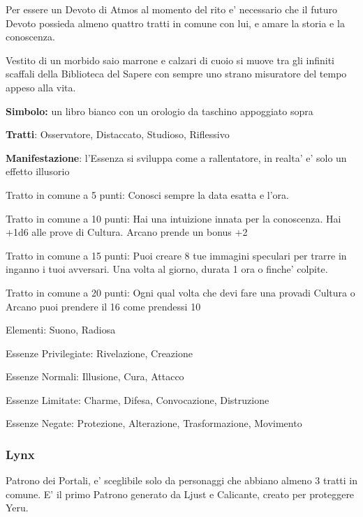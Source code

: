 \documentclass[a4paper,11pt,twoside,openany]{book}
\begin{document}
{		Per essere un Devoto di Atmos al momento del rito e' necessario che il futuro Devoto possieda almeno quattro tratti in comune con lui, e amare la storia e la conoscenza.
		
		Vestito di un morbido saio marrone e calzari di cuoio si muove tra gli infiniti scaffali della Biblioteca del Sapere con sempre uno strano misuratore del tempo appeso alla vita.
		
		\textbf{Simbolo:} un libro bianco con un orologio da taschino appoggiato
		sopra
		
		\textbf{Tratti}: Osservatore, Distaccato, Studioso, Riflessivo
		
		\textbf{Manifestazione}: l'Essenza si sviluppa come a rallentatore, in realta' e' solo un effetto illusorio
		
		\bigskip
		
		Tratto in comune a 5 punti: Conosci sempre la data esatta e l'ora.
		
		Tratto in comune a 10 punti: Hai una intuizione innata per la conoscenza. Hai +1d6 alle prove di Cultura. Arcano prende un bonus +2
		
		Tratto in comune a 15 punti: Puoi creare 8 tue immagini speculari per trarre in inganno i tuoi avversari. Una volta al giorno, durata 1 ora o finche' colpite.
		
		Tratto in comune a 20 punti: Ogni qual volta che devi fare una provadi Cultura o Arcano puoi prendere il 16 come prendessi 10
		
		\bigskip
		
		Elementi: Suono, Radiosa
		
		\bigskip
		
		Essenze Privilegiate: Rivelazione, Creazione
		
		Essenze Normali: Illusione, Cura, Attacco
		
		Essenze Limitate: Charme, Difesa, Convocazione, Distruzione
		
		Essenze Negate: Protezione, Alterazione, Trasformazione, Movimento
		
		\subsubsection{Lynx}
		
		\label{lynx}
		
		Patrono dei Portali, e' sceglibile solo da personaggi che abbiano almeno 3 tratti in comune. E' il primo Patrono generato da Ljust e Calicante, creato per proteggere Yeru.
		
}
\end{document}
